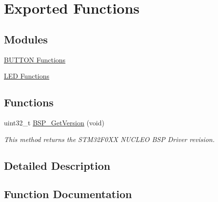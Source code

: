 \hypertarget{group___s_t_m32_f0_x_x___n_u_c_l_e_o___exported___functions}{}\section{Exported Functions}
\label{group___s_t_m32_f0_x_x___n_u_c_l_e_o___exported___functions}
\subsection*{Modules}
\begin{DoxyCompactItemize}
\item 
\hyperlink{group___s_t_m32_f0_x_x___n_u_c_l_e_o___b_u_t_t_o_n___functions}{B\+U\+T\+T\+O\+N Functions}
\item 
\hyperlink{group___s_t_m32_f0_x_x___n_u_c_l_e_o___l_e_d___functions}{L\+E\+D Functions}
\end{DoxyCompactItemize}
\subsection*{Functions}
\begin{DoxyCompactItemize}
\item 
uint32\+\_\+t \hyperlink{group___s_t_m32_f0_x_x___n_u_c_l_e_o___exported___functions_ga65d13608f7010a8068614154cb142cd6}{B\+S\+P\+\_\+\+Get\+Version} (void)
\begin{DoxyCompactList}\small\item\em This method returns the S\+T\+M32\+F0\+XX N\+U\+C\+L\+EO B\+SP Driver revision. \end{DoxyCompactList}\end{DoxyCompactItemize}


\subsection{Detailed Description}


\subsection{Function Documentation}
\mbox{\label{group___s_t_m32_f0_x_x___n_u_c_l_e_o___exported___functions_ga65d13608f7010a8068614154cb142cd6}} 
